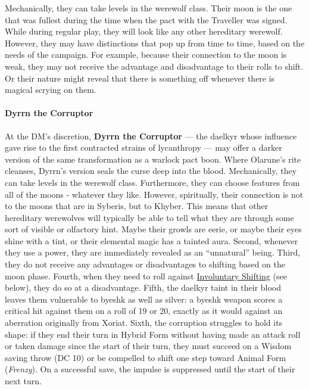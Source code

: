 \documentclass[twocolumn]{dndbook}
\begin{document}
Mechanically, they can take levels in the werewolf class.
Their moon is the one that was fullest during the time when the pact with the Traveller was signed.
While during regular play, they will look like any other hereditary werewolf.
However, they may have distinctions that pop up from time to time, based on the needs of the campaign.
For example, because their connection to the moon is weak, they may not receive the advantage and disadvantage to their rolls to shift.
Or their nature might reveal that there is something off whenever there is magical scrying on them.\par

\paragraph*{Dyrrn the Corruptor}\label{par:dyrrn-corruptor}
At the DM's discretion, \textbf{Dyrrn the Corruptor} --- the daelkyr whose influence gave rise to the first contracted strains of lycanthropy --- may offer a darker version of the same transformation as a warlock pact boon.
Where Olarune's rite cleanses, Dyrrn's version seals the curse deep into the blood.
Mechanically, they can take levels in the werewolf class.
Furthermore, they can choose features from all of the moons - whatever they like.
However, spiritually, their connection is not to the moons that are in Syberis, but to Khyber.
This means that other hereditary werewolves will typically be able to tell what they are through some sort of visible or olfactory hint.
Maybe their growls are eerie, or maybe their eyes shine with a tint, or their elemental magic has a tainted aura.
Second, whenever they use a power, they are immediately revealed as an ``unnatural'' being.
Third, they do not receive any advantages or disadvantages to shifting based on the moon phase.
Fourth, when they need to roll against \hyperref[sec:involuntary-shifting]{Involuntary Shifting} (see below), they do so at a disadvantage.
Fifth, the daelkyr taint in their blood leaves them vulnerable to byeshk as well as silver: a byeshk weapon scores a critical hit against them on a roll of 19 or 20, exactly as it would against an aberration originally from Xoriat.
Sixth, the corruption struggles to hold its shape: if they end their turn in Hybrid Form without having made an attack roll or taken damage since the start of their turn, they must succeed on a Wisdom saving throw (DC 10) or be compelled to shift one step toward Animal Form (\emph{Frenzy}).
On a successful save, the impulse is suppressed until the start of their next turn.\par
\end{document}
